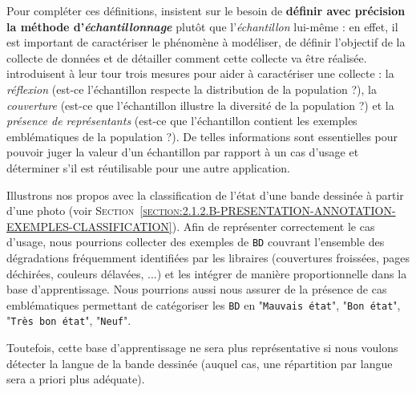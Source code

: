 			Pour compléter ces définitions, \cite{kruskal-mosteller:1979:representative-sampling-ii} insistent sur le besoin de \textbf{définir avec précision la méthode d'\textit{échantillonnage}} plutôt que l'\textit{échantillon} lui-même : en effet, il est important de caractériser le phénomène à modéliser, de définir l'objectif de la collecte de données et de détailler comment cette collecte va être réalisée.
			\cite{clemmensen-kjaersgaard:2022:data-representativity-machine} introduisent à leur tour trois mesures pour aider à caractériser une collecte : la \textit{réflexion} (est-ce l'échantillon respecte la distribution de la population ?), la \textit{couverture} (est-ce que l'échantillon illustre la diversité de la population ?) et la \textit{présence de représentants} (est-ce que l'échantillon contient les exemples emblématiques de la population ?).
			De telles informations sont essentielles pour pouvoir juger la valeur d'un échantillon par rapport à un cas d'usage et déterminer s'il est réutilisable pour une autre application.
			\begin{leftBarExamples}
				Illustrons nos propos avec la classification de l'état d'une bande dessinée à partir d'une photo (voir \textsc{Section~\ref{section:2.1.2.B-PRESENTATION-ANNOTATION-EXEMPLES-CLASSIFICATION}}).
				Afin de représenter correctement le cas d'usage, nous pourrions collecter des exemples de \texttt{BD} couvrant l'ensemble des dégradations fréquemment identifiées par les libraires (couvertures froissées, pages déchirées, couleurs délavées, ...) et les intégrer de manière proportionnelle dans la base d'apprentissage.
				Nous pourrions aussi nous assurer de la présence de cas emblématiques permettant de catégoriser les \texttt{BD} en "\texttt{Mauvais état}", "\texttt{Bon état}", "\texttt{Très bon état}", "\texttt{Neuf}".
				
				Toutefois, cette base d'apprentissage ne sera plus représentative si nous voulons détecter la langue de la bande dessinée (auquel cas, une répartition par langue sera a priori plus adéquate).
			\end{leftBarExamples}
			

